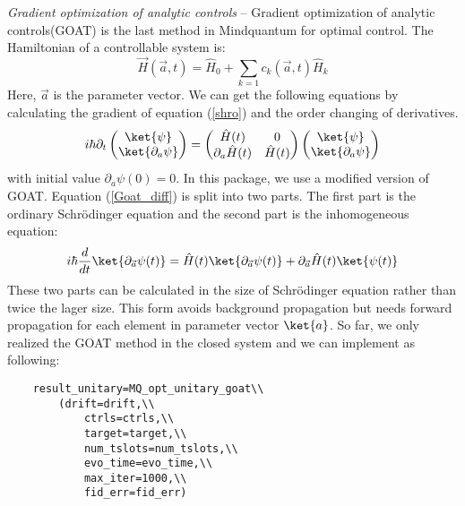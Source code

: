 \textit{Gradient optimization of analytic controls} -- Gradient optimization of analytic controls(GOAT) is the last method in Mindquantum for optimal control. The Hamiltonian of a controllable system is:
\begin{equation}
    \vec{H}(\vec{a},t)=\hat{H}_{0}+\sum_{k=1}c_{k}(\vec{a},t)\hat{H}_{k}
\end{equation}
Here, $\vec{a}$ is the parameter vector. We can get the following equations by calculating the gradient of equation (\ref{shro}) and the order changing of derivatives.
\begin{equation}
    i\hbar\partial_{t}
    \begin{pmatrix}
        \ket{\psi} \\
        \ket{\partial_{a}\psi}
    \end{pmatrix}
    =
    \begin{pmatrix}
        \hat{H}(t) & 0 \\
        \partial_{a}\hat{H}(t) & \hat{H}(t)
    \end{pmatrix}
    \begin{pmatrix}
        \ket{\psi} \\
        \ket{\partial_{a}\psi}
    \end{pmatrix}
    \label{Goat_diff}
\end{equation}
with initial value $\partial_{a}\psi(0)=0$. In this package, we use a modified version of GOAT. Equation (\ref{Goat_diff}) is split into two parts. The first part is the ordinary Schrödinger equation and the second part is the inhomogeneous equation:
\begin{equation}
    i\hbar\frac{d}{dt}\ket{\partial_{\vec{a}}\psi(t)}=\hat{H}(t)\ket{\partial_{\vec{a}}\psi(t)}+\partial_{\vec{a}}\hat{H}(t)\ket{\psi(t)}
\end{equation}
These two parts can be calculated in the size of Schrödinger equation rather than twice the lager size. This form avoids background propagation but needs forward propagation for each element in parameter vector $\ket{a}$. So far, we only realized the GOAT method in the closed system and we can implement as following:
\begin{lstlisting}
    result_unitary=MQ_opt_unitary_goat\\
        (drift=drift,\\
            ctrls=ctrls,\\
            target=target,\\
            num_tslots=num_tslots,\\
            evo_time=evo_time,\\
            max_iter=1000,\\
            fid_err=fid_err)
\end{lstlisting}